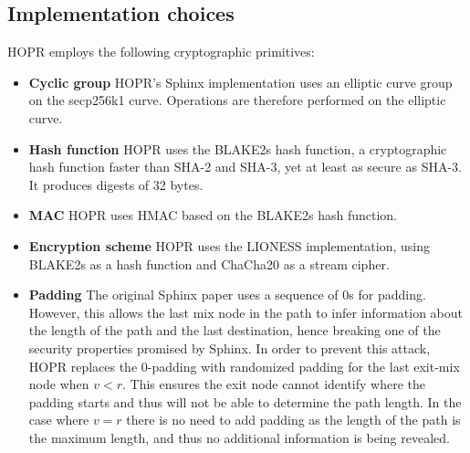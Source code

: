 \subsection{Implementation choices}

HOPR employs the following cryptographic primitives:

\begin{itemize}
    \item \textbf{Cyclic group} HOPR's Sphinx implementation uses an elliptic curve group on the secp256k1 curve. Operations are therefore performed on the elliptic curve.

    \item \textbf{Hash function} HOPR uses the BLAKE2s hash function, a cryptographic
        hash function faster than SHA-2 and SHA-3, yet at least as secure as
        SHA-3. It produces digests of 32 bytes.

    \item \textbf{MAC} HOPR uses HMAC based on the BLAKE2s hash function.

    \item \textbf{Encryption scheme} HOPR uses the LIONESS \cite{lionesspaper}
        implementation, using BLAKE2s as a hash function and ChaCha20 as a
        stream cipher.

    \item \textbf{Padding} The original Sphinx paper uses a sequence of 0s
        for padding. However, this allows the last mix node in the path to infer
        information about the length of the path and the last destination, hence
        breaking one of the security properties promised by Sphinx. In order to
        prevent this attack, HOPR replaces the 0-padding with randomized padding
        for the last exit-mix node when $v<r$. This ensures the exit node cannot
        identify where the padding starts and thus will not be able to determine the
        path length. In the case where $v=r$ there is
        no need to add padding as the length of the path is the maximum length,
        and thus no additional information is being revealed.

\end{itemize}
